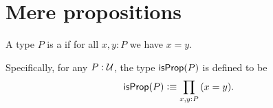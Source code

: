 \documentclass[hott-all.tex]{subfiles}
\begin{document}
\section{Mere propositions}
%
%

\begin{defn}
  A type $P$ is a 
  if for all $x,y:P$ we have $x=y$.
\end{defn}

Specifically, for any $P:\mathcal{U}$, the type $\mathsf{isProp}(P)$ is defined to be
\[ \isprop(P) \defeq \prd{x,y:P} (x=y). \]
\end{document}

